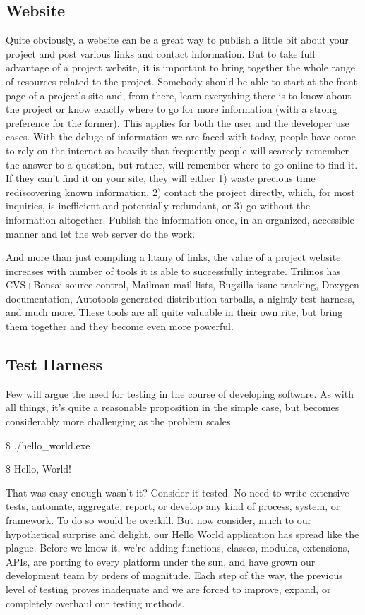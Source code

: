 \documentclass[12pt,relax]{article}
\begin{document}
\subsection{Website}

Quite obviously, a website can be a great way to publish a little bit about
your project and post various links and contact information.  But to take full
advantage of a project website, it is important to bring together the whole
range of resources related to the project.  Somebody should be able to start at
the front page of a project's site and, from there, learn everything there is
to know about the project or know exactly where to go for more information
(with a strong preference for the former).  This applies for both the user
and the developer use cases.  With the deluge of information we are faced with
today, people have come to rely on the internet so heavily that frequently
people will scarcely remember the answer to a question, but rather, will
remember where to go online to find it.  If they can't find it on your site,
they will either 1) waste precious time rediscovering known information, 2)
contact the project directly, which, for most inquiries, is inefficient and
potentially redundant, or 3) go without the information altogether.  Publish
the information once, in an organized, accessible manner and let the web server
do the work.

And more than just compiling a litany of links, the value of a project website
increases with number of tools it is able to successfully integrate.  Trilinos
has CVS+Bonsai source control, Mailman mail lists, Bugzilla issue tracking,
Doxygen documentation, Autotools-generated distribution tarballs, a nightly
test harness, and much more.  These tools are all quite valuable in their own
rite, but bring them together and they become even more powerful.

\subsection{Test Harness}

Few will argue the need for testing in the course of developing software.  As
with all things, it's quite a reasonable proposition in the simple case, but
becomes considerably more challenging as the problem scales.

\$ ./hello\_world.exe

\$ Hello, World!

That was easy enough wasn't it?  Consider it tested.  No need to write
extensive tests, automate, aggregate, report, or develop any kind of process,
system, or framework.  To do so would be overkill.  But now consider, much to
our hypothetical surprise and delight, our Hello World application has spread
like the plague.  Before we know it, we're adding functions, classes, modules,
extensions, APIs, are porting to every platform under the sun, and have grown
our development team by orders of magnitude.  Each step of the way, the
previous level of testing proves inadequate and we are forced to improve,
expand, or completely overhaul our testing methods.
\end{document}

